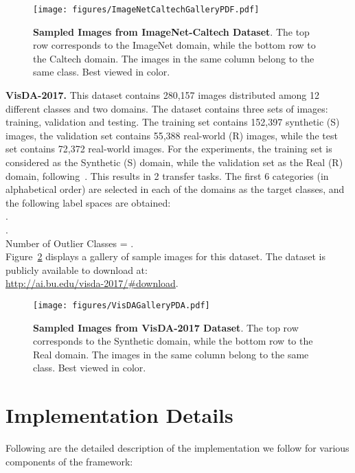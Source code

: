 \documentclass[10pt,twocolumn,letterpaper]{article}
\begin{document}
\begin{figure}[!tbp]
	\begin{center}
	\texttt{[image: figures/ImageNetCaltechGalleryPDF.pdf]}
	\end{center}
	\vskip -0.15in
	\caption{\small \textbf{Sampled Images from ImageNet-Caltech Dataset}.
The top row corresponds to the ImageNet domain, while the bottom row to the Caltech domain. The images in the same column belong to the same class. Best viewed in color.}
	\label{fig:imagenet-caltech-gallery}
 	\vskip -0.1in
\end{figure} 
\vspace{2mm}
\noindent
\textbf{VisDA-2017.} This dataset contains 280,157 images distributed among 12 different classes and two domains. The dataset contains three sets of images: training, validation and testing. The training set contains 152,397 synthetic (S) images, the validation set contains 55,388 real-world (R) images, while the test set contains 72,372 real-world images. For the experiments, the training set is considered as the Synthetic (S) domain, while the validation set as the Real (R) domain, following~\cite{li2020deep}. This results in 2 transfer tasks. The first 6 categories (in alphabetical order) are selected in each of the domains as the target classes, and the following label spaces are obtained: \\
.\\
.\\
Number of Outlier Classes = .\\
Figure~\ref{fig:visda-gallery} displays a gallery of sample images for this dataset. The dataset is publicly available to download at:\\ \url{http://ai.bu.edu/visda-2017/#download}.

\begin{figure}[!tbp]
	\begin{center}
	\texttt{[image: figures/VisDAGalleryPDA.pdf]}
	\end{center}
	\vskip -0.15in
	\caption{\small \textbf{Sampled Images from VisDA-2017 Dataset}.
The top row corresponds to the Synthetic domain, while the bottom row to the Real domain. The images in the same column belong to the same class. Best viewed in color.}
	\label{fig:visda-gallery}
 	\vskip -0.15in
\end{figure}  
\section{Implementation Details}
Following are the detailed description of the implementation we follow for various components of the framework: 
\end{document}
